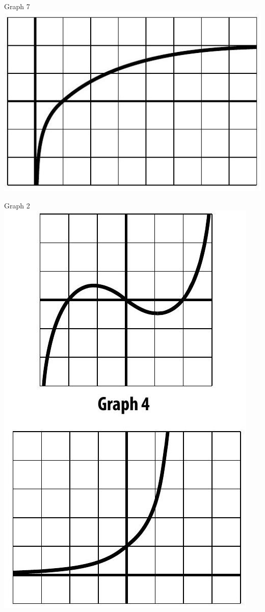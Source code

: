 \documentclass[10pt]{article}
\begin{document}
Graph 7\\
\includegraphics[max width=\textwidth, center]{2024_12_26_08a12fb3da5425a27925g-5(1)}

Graph 2\\
\includegraphics[max width=\textwidth, center]{2024_12_26_08a12fb3da5425a27925g-5(4)}
\end{document}
